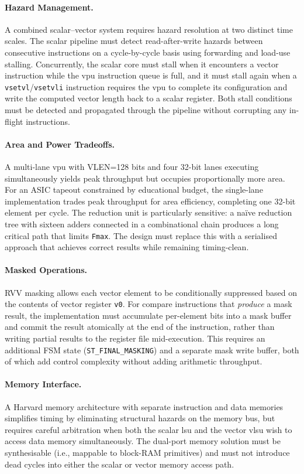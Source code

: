 \paragraph{Hazard Management.}
A combined scalar--vector system requires hazard resolution at two distinct time
scales. The scalar pipeline must detect read-after-write hazards between consecutive
instructions on a cycle-by-cycle basis using forwarding and load-use stalling.
Concurrently, the scalar core must stall when it encounters a vector instruction while
the \gls{vpu} instruction queue is full, and it must stall again when a
\texttt{vsetvl}/\texttt{vsetvli} instruction requires the \gls{vpu} to complete its
configuration and write the computed vector length back to a scalar register. Both
stall conditions must be detected and propagated through the pipeline without corrupting
any in-flight instructions.

\paragraph{Area and Power Tradeoffs.}
A multi-lane \gls{vpu} with VLEN=128 bits and four 32-bit lanes executing simultaneously
yields peak throughput but occupies proportionally more area. For an ASIC tapeout
constrained by educational budget, the single-lane implementation trades peak throughput
for area efficiency, completing one 32-bit element per cycle. The reduction unit is
particularly sensitive: a na\"ive reduction tree with sixteen adders connected in a
combinational chain produces a long critical path that limits \texttt{Fmax}. The
design must replace this with a serialised approach that achieves correct results while
remaining timing-clean.

\paragraph{Masked Operations.}
RVV masking allows each vector element to be conditionally suppressed based on the
contents of vector register \texttt{v0}. For compare instructions that \emph{produce}
a mask result, the implementation must accumulate per-element bits into a mask buffer
and commit the result atomically at the end of the instruction, rather than writing
partial results to the register file mid-execution. This requires an additional FSM
state (\texttt{ST\_FINAL\_MASKING}) and a separate mask write buffer, both of which
add control complexity without adding arithmetic throughput.

\paragraph{Memory Interface.}
A Harvard memory architecture with separate instruction and data memories simplifies
timing by eliminating structural hazards on the memory bus, but requires careful
arbitration when both the scalar \gls{lsu} and the vector \gls{vlsu} wish to access
data memory simultaneously. The dual-port memory solution must be synthesisable (i.e.,
mappable to block-RAM primitives) and must not introduce dead cycles into either
the scalar or vector memory access path.


